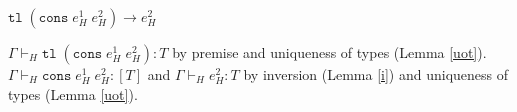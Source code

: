 \begin{case}
$\mathtt{tl}\;(\mathtt{cons}\;e_{H}^{1}\;e_{H}^{2})\rightarrow e_{H}^{2}$

$\Gamma\vdash_{H}\mathtt{tl}\;(\mathtt{cons}\;e_{H}^{1}\;e_{H}^{2}):T$ by premise and uniqueness of types (Lemma \ref{uot}).  $\Gamma\vdash_{H}\mathtt{cons}\;e_{H}^{1}\;e_{H}^{2}:[T]$ and $\Gamma\vdash_{H}e_{H}^{2}:T$ by inversion (Lemma \ref{i}) and uniqueness of types (Lemma \ref{uot}).
\end{case}